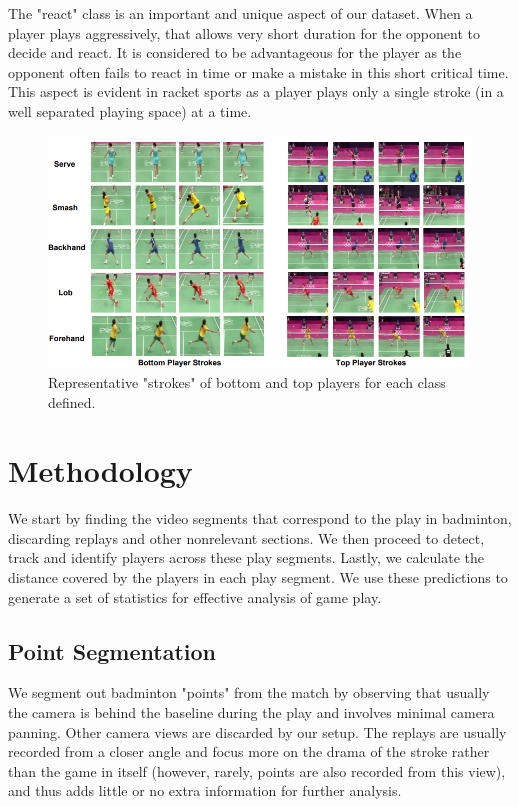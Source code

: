 \documentclass[runningheads,a4paper]{llncs}
\begin{document}
The "react" class is an important and unique aspect of our dataset. When a player plays aggressively, that allows very short duration for the opponent to decide and react. It is considered to be advantageous for the player as the opponent often fails to react in time or make a mistake in this short critical time. This aspect is evident in racket sports as a player plays only a single stroke (in a well separated playing space) at a time.
\begin{figure}[!htbp]
    \centering
    \includegraphics[width=0.9\linewidth]{Images/shots.png}
    \caption{Representative "strokes" of bottom and top players for each class defined.}
    \label{fig:shots}
\end{figure}

\section{Methodology}

\hspace{1cm}We start by finding the video segments that correspond to the play in badminton, discarding replays and other nonrelevant sections. We then proceed to detect, track and identify players across these play segments. Lastly, we calculate the distance covered by the players in each play segment. We use these predictions to generate a set of statistics for effective analysis of game play.

\subsection{Point Segmentation}

We segment out badminton "points" from the match by observing that usually the camera is behind the baseline during the play and involves minimal camera panning. Other camera views are discarded by our setup.  The replays are usually recorded from a closer angle and focus more on the drama of the stroke rather than the game in itself (however, rarely, points are also recorded from this view), and thus adds little or no extra information for further analysis.
\end{document}
